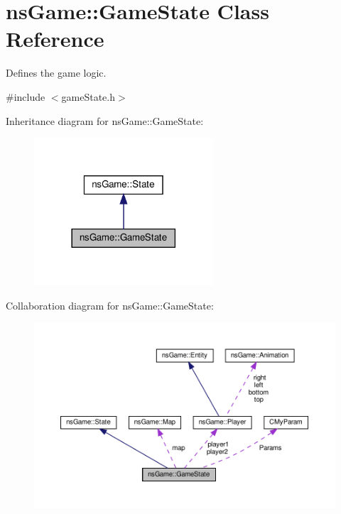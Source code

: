 \hypertarget{classns_game_1_1_game_state}{}\section{ns\+Game\+:\+:Game\+State Class Reference}
\label{classns_game_1_1_game_state}


Defines the game logic.  




{\ttfamily \#include $<$game\+State.\+h$>$}



Inheritance diagram for ns\+Game\+:\+:Game\+State\+:\nopagebreak
\begin{figure}[H]
\begin{center}
\leavevmode
\includegraphics[width=189pt]{classns_game_1_1_game_state__inherit__graph}
\end{center}
\end{figure}


Collaboration diagram for ns\+Game\+:\+:Game\+State\+:\nopagebreak
\begin{figure}[H]
\begin{center}
\leavevmode
\includegraphics[width=350pt]{classns_game_1_1_game_state__coll__graph}
\end{center}
\end{figure}
